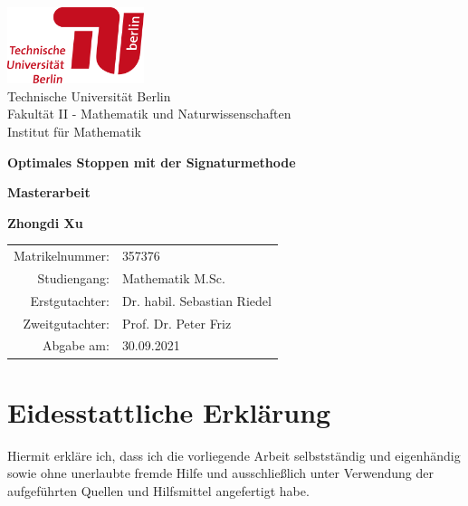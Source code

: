 \documentclass[12pt,titlepage,headsepline]{article}
\begin{document}
    \begin{titlepage}
      \begin{center}
        \includegraphics[width=0.3\textwidth]{TU.png}\\
        Technische Universität Berlin \\
        Fakultät II - Mathematik und Naturwissenschaften\\
        Institut für Mathematik

        \vspace{1.5cm}
        \LARGE
        \textbf{Optimales Stoppen mit der Signaturmethode}

        \vspace{1.5cm}
        \Huge
        \textbf{Masterarbeit}

        \vspace{1cm}
        \small

        \large
        \textbf{Zhongdi Xu}

        \vspace{4cm}

        \small{\scshape
        \begin{tabular}{rl}
         Matrikelnummer: & 357376 \\
         Studiengang: & Mathematik M.Sc.\\
         Erstgutachter: & Dr. habil. Sebastian Riedel\\
         Zweitgutachter: & Prof. Dr. Peter Friz \\
         Abgabe am: & 30.09.2021\\
         \end{tabular}
        }

      \end{center}
    \end{titlepage}
    \newpage
    \tableofcontents
    \newpage

    \section*{Eidesstattliche Erklärung}
    \thispagestyle{empty}
    Hiermit erkläre ich, dass ich die vorliegende Arbeit selbstständig und eigenhändig sowie ohne unerlaubte fremde Hilfe und ausschließlich unter Verwendung der aufgeführten Quellen und Hilfsmittel angefertigt habe.
\end{document}
